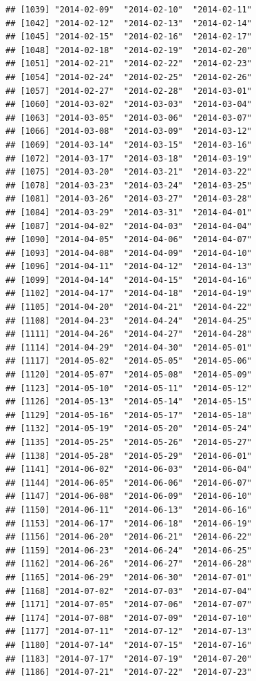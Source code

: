\documentclass[10pt]{article}\usepackage[]{graphicx}\usepackage[]{color}
\makeatletter
\newenvironment{kframe}{%
 \def\at@end@of@kframe{}%
 \ifinner\ifhmode%
  \def\at@end@of@kframe{\end{minipage}}%
  \begin{minipage}{\columnwidth}%
 \fi\fi%
 \def\FrameCommand##1{\hskip\@totalleftmargin \hskip-\fboxsep
 \colorbox{shadecolor}{##1}\hskip-\fboxsep
     \hskip-\linewidth \hskip-\@totalleftmargin \hskip\columnwidth}%
 \MakeFramed {\advance\hsize-\width
   \@totalleftmargin\z@ \linewidth\hsize
   \@setminipage}}%
 {\par\unskip\endMakeFramed%
 \at@end@of@kframe}
\newenvironment{knitrout}{}{} %
\theoremstyle{plain}
\makeatother
\begin{document}
\begin{knitrout}
\begin{kframe}
\begin{verbatim}
## [1039] "2014-02-09"  "2014-02-10"  "2014-02-11" 
## [1042] "2014-02-12"  "2014-02-13"  "2014-02-14" 
## [1045] "2014-02-15"  "2014-02-16"  "2014-02-17" 
## [1048] "2014-02-18"  "2014-02-19"  "2014-02-20" 
## [1051] "2014-02-21"  "2014-02-22"  "2014-02-23" 
## [1054] "2014-02-24"  "2014-02-25"  "2014-02-26" 
## [1057] "2014-02-27"  "2014-02-28"  "2014-03-01" 
## [1060] "2014-03-02"  "2014-03-03"  "2014-03-04" 
## [1063] "2014-03-05"  "2014-03-06"  "2014-03-07" 
## [1066] "2014-03-08"  "2014-03-09"  "2014-03-12" 
## [1069] "2014-03-14"  "2014-03-15"  "2014-03-16" 
## [1072] "2014-03-17"  "2014-03-18"  "2014-03-19" 
## [1075] "2014-03-20"  "2014-03-21"  "2014-03-22" 
## [1078] "2014-03-23"  "2014-03-24"  "2014-03-25" 
## [1081] "2014-03-26"  "2014-03-27"  "2014-03-28" 
## [1084] "2014-03-29"  "2014-03-31"  "2014-04-01" 
## [1087] "2014-04-02"  "2014-04-03"  "2014-04-04" 
## [1090] "2014-04-05"  "2014-04-06"  "2014-04-07" 
## [1093] "2014-04-08"  "2014-04-09"  "2014-04-10" 
## [1096] "2014-04-11"  "2014-04-12"  "2014-04-13" 
## [1099] "2014-04-14"  "2014-04-15"  "2014-04-16" 
## [1102] "2014-04-17"  "2014-04-18"  "2014-04-19" 
## [1105] "2014-04-20"  "2014-04-21"  "2014-04-22" 
## [1108] "2014-04-23"  "2014-04-24"  "2014-04-25" 
## [1111] "2014-04-26"  "2014-04-27"  "2014-04-28" 
## [1114] "2014-04-29"  "2014-04-30"  "2014-05-01" 
## [1117] "2014-05-02"  "2014-05-05"  "2014-05-06" 
## [1120] "2014-05-07"  "2014-05-08"  "2014-05-09" 
## [1123] "2014-05-10"  "2014-05-11"  "2014-05-12" 
## [1126] "2014-05-13"  "2014-05-14"  "2014-05-15" 
## [1129] "2014-05-16"  "2014-05-17"  "2014-05-18" 
## [1132] "2014-05-19"  "2014-05-20"  "2014-05-24" 
## [1135] "2014-05-25"  "2014-05-26"  "2014-05-27" 
## [1138] "2014-05-28"  "2014-05-29"  "2014-06-01" 
## [1141] "2014-06-02"  "2014-06-03"  "2014-06-04" 
## [1144] "2014-06-05"  "2014-06-06"  "2014-06-07" 
## [1147] "2014-06-08"  "2014-06-09"  "2014-06-10" 
## [1150] "2014-06-11"  "2014-06-13"  "2014-06-16" 
## [1153] "2014-06-17"  "2014-06-18"  "2014-06-19" 
## [1156] "2014-06-20"  "2014-06-21"  "2014-06-22" 
## [1159] "2014-06-23"  "2014-06-24"  "2014-06-25" 
## [1162] "2014-06-26"  "2014-06-27"  "2014-06-28" 
## [1165] "2014-06-29"  "2014-06-30"  "2014-07-01" 
## [1168] "2014-07-02"  "2014-07-03"  "2014-07-04" 
## [1171] "2014-07-05"  "2014-07-06"  "2014-07-07" 
## [1174] "2014-07-08"  "2014-07-09"  "2014-07-10" 
## [1177] "2014-07-11"  "2014-07-12"  "2014-07-13" 
## [1180] "2014-07-14"  "2014-07-15"  "2014-07-16" 
## [1183] "2014-07-17"  "2014-07-19"  "2014-07-20" 
## [1186] "2014-07-21"  "2014-07-22"  "2014-07-23" 

\end{verbatim}
\end{kframe}
\end{knitrout}
\end{document}
